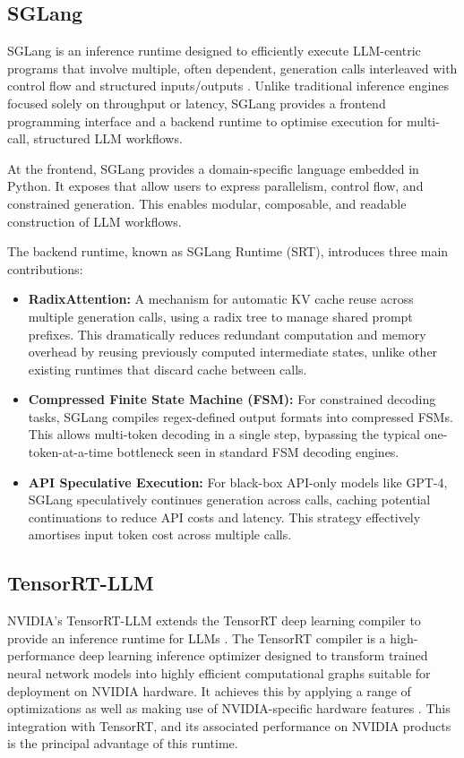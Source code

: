 \documentclass[11pt,twoside]{report}
\begin{document}
\subsection{SGLang}
SGLang is an inference runtime designed to efficiently execute LLM-centric programs that involve multiple, often dependent, generation calls interleaved with control flow and structured inputs/outputs \cite{zheng2024sglang}. 
Unlike traditional inference engines focused solely on throughput or latency, SGLang provides a frontend programming interface and a backend runtime to optimise execution for multi-call, structured LLM workflows.

At the frontend, SGLang provides a domain-specific language embedded in Python. 
It exposes that allow users to express parallelism, control flow, and constrained generation.
This enables modular, composable, and readable construction of LLM workflows.

The backend runtime, known as SGLang Runtime (SRT), introduces three main contributions: 
\begin{itemize}
  \item \textbf{RadixAttention:} A mechanism for automatic KV cache reuse across multiple generation calls, using a radix tree to manage shared prompt prefixes. 
    This dramatically reduces redundant computation and memory overhead by reusing previously computed intermediate states, unlike other existing runtimes that discard cache between calls.
  \item \textbf{Compressed Finite State Machine (FSM):} For constrained decoding tasks, SGLang compiles regex-defined output formats into compressed FSMs. 
    This allows multi-token decoding in a single step, bypassing the typical one-token-at-a-time bottleneck seen in standard FSM decoding engines.
  \item \textbf{API Speculative Execution:} For black-box API-only models like GPT-4, SGLang speculatively continues generation across calls, caching potential continuations to reduce API costs and latency. 
    This strategy effectively amortises input token cost across multiple calls.
\end{itemize}

\subsection{TensorRT-LLM}
NVIDIA's TensorRT-LLM extends the TensorRT deep learning compiler to provide an inference runtime for LLMs \cite{nvidiainferencewhitepaper}.
The TensorRT compiler is a high-performance deep learning inference optimizer designed to transform trained neural network models into highly efficient computational graphs suitable for deployment on NVIDIA hardware. 
It achieves this by applying a range of optimizations as well as making use of NVIDIA-specific hardware features \cite{nvidiainferencewhitepaper}. 
This integration with TensorRT, and its associated performance on NVIDIA products is the principal advantage of this runtime.
\end{document}
